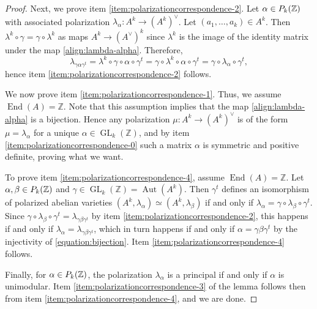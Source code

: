 \documentclass[a4paper,11pt,reqno]{amsart}
\numberwithin{equation}{section}
\theoremstyle{plain}
\theoremstyle{definition}
\newcommand{\Z}{\mathbb Z}
\let\rm\relax
\newcommand{\rm}[1]{{\mathrm{#1}}}
\newcommand{\End}{\operatorname{End}}
\newcommand{\Aut}{\operatorname{Aut}}
\newcommand{\GL}{\operatorname{GL}}
\renewcommand{\cong}{\simeq}
\begin{document}
\begin{proof}
Next, we prove item \eqref{item:polarizationcorrespondence-2}. 
Let $\alpha \in \rm{P}_k(\Z)$ with associated polarization $\lambda_\alpha \colon A^k \to (A^k)^\vee$. 
Let $(a_1, \dotsc, a_k) \in A^k$. 
Then $\lambda^k \circ \gamma = \gamma \circ \lambda^k$ as maps $A^k \to (A^\vee)^k$ since $\lambda^k$ is the image of the identity matrix under the map \eqref{align:lambda-alpha}. 
Therefore,
\[
\lambda_{\gamma \alpha \gamma^t} = \lambda^k \circ \gamma \circ \alpha \circ \gamma^t = \gamma \circ \lambda^k \circ \alpha \circ \gamma^t = \gamma \circ \lambda_\alpha \circ \gamma^t, 
\] 
hence item \eqref{item:polarizationcorrespondence-2} follows. 

We now prove item \eqref{item:polarizationcorrespondence-1}. Thus, we assume $\End(A) = \Z$. Note that this assumption implies that the map \eqref{align:lambda-alpha} is a bijection. Hence any polarization $\mu \colon A^k \to (A^k)^\vee$ is of the form $\mu = \lambda_\alpha$ for a unique $\alpha \in \GL_k(\Z)$, and by item \eqref{item:polarizationcorrespondence-0} such a matrix $\alpha$ is symmetric and positive definite, proving what we want. 

To prove item \eqref{item:polarizationcorrespondence-4}, assume $\End(A) = \Z$. Let $\alpha, \beta \in \rm{P}_k(\Z)$ and $\gamma \in \GL_k(\Z) = \Aut(A^k)$.
Then $\gamma^t$ defines an isomorphism of polarized abelian varieties $(A^k, \lambda_\alpha) \cong (A^k, \lambda_\beta)$ if and only if $\lambda_\alpha = \gamma \circ \lambda_\beta \circ \gamma^t$. Since $\gamma \circ \lambda_\beta \circ \gamma^t = \lambda_{\gamma \beta \gamma^t}$ by item \eqref{item:polarizationcorrespondence-2}, this happens if and only if $\lambda_\alpha = \lambda_{\gamma \beta \gamma^t}$, which in turn happens if and only if $\alpha = \gamma \beta \gamma^t$ by the injectivity of \eqref{equation:bijection}. Item \eqref{item:polarizationcorrespondence-4} follows. 

Finally, for $\alpha \in \rm{P}_k(\Z)$, the polarization $\lambda_\alpha$ is a principal if and only if $\alpha$ is unimodular. 
Item \eqref{item:polarizationcorrespondence-3} of the lemma follows then from item \eqref{item:polarizationcorrespondence-4}, and we are done. 
\end{proof}
\end{document}
